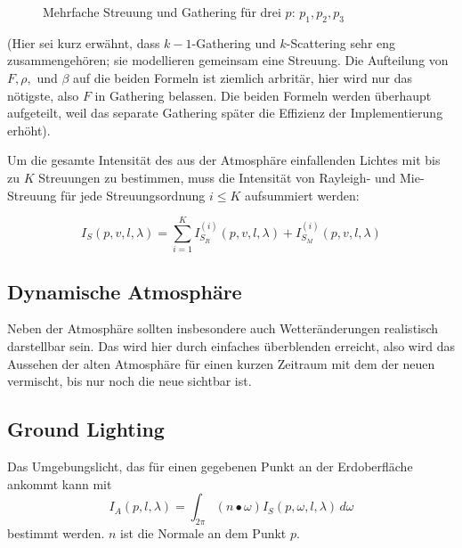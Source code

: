 \begin{figure}
	\caption{Mehrfache Streuung und Gathering für drei $p$: $p_1, p_2, p_3$}
	\label{MS-image}
\end{figure}

(Hier sei kurz erwähnt, dass $k-1$-Gathering und $k$-Scattering sehr eng zusammengehören; sie modellieren gemeinsam eine
Streuung. Die Aufteilung von $F,\rho,$ und $\beta$ auf die beiden Formeln ist ziemlich arbritär, hier wird nur das
nötigste, also $F$ in Gathering belassen. Die beiden Formeln werden überhaupt aufgeteilt, weil das separate Gathering
später die Effizienz der Implementierung erhöht).

Um die gesamte Intensität des aus der Atmosphäre einfallenden Lichtes mit bis zu $K$ Streuungen zu bestimmen, muss die
Intensität von Rayleigh- und Mie-Streuung für jede Streuungsordnung $i \le K$ aufsummiert werden:

\begin{equation} \label{eq:insc_total}
	I_S(p,v,l,\lambda) = \sum^{K}_{i=1} I^{(i)}_{S_R}(p, v, l, \lambda) + I^{(i)}_{S_M}(p, v, l, \lambda) 
\end{equation}

\subsection{Dynamische Atmosphäre}
Neben der Atmosphäre sollten insbesondere auch Wetteränderungen realistisch darstellbar sein. Das wird hier durch
einfaches überblenden erreicht, also wird das Aussehen der alten Atmosphäre für einen kurzen Zeitraum mit dem der neuen
vermischt, bis nur noch die neue sichtbar ist.

\subsection{Ground Lighting}
Das Umgebungslicht, das für einen gegebenen Punkt an der Erdoberfläche ankommt kann mit
\begin{equation} \label{eq:gl}
	I_A(p,l,\lambda) = \int_{2\pi}^{} (n \bullet \omega)I_S(p, \omega, l, \lambda) \,d\omega
\end{equation}
bestimmt werden. $n$ ist die Normale an dem Punkt $p$.

